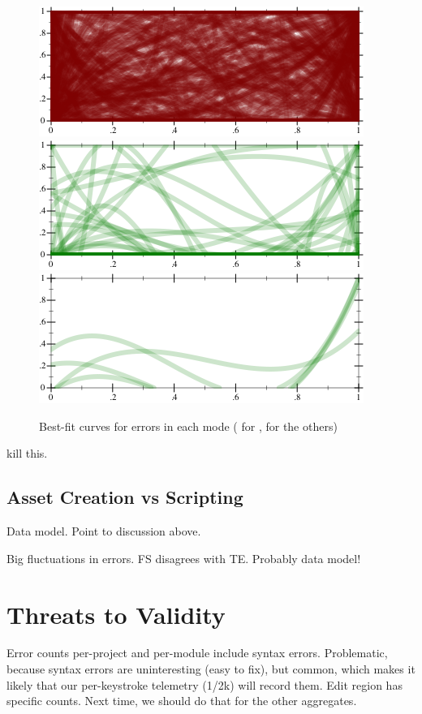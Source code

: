 \documentclass[english,submission,cleveref]{programming}
\begin{document}
\begin{figure}[t]
  \includegraphics[width=0.8\columnwidth]{img/fit-nocheck-Force-3.pdf}
  \includegraphics[width=0.8\columnwidth]{img/fit-nonstrict-TypeE-3.pdf}
  \includegraphics[width=0.8\columnwidth]{img/fit-strict-TypeE-3.pdf}
  \caption{Best-fit curves for errors in each mode ( for \mnocheck{},  for the others)}
  \label{f:scribbles}
\end{figure}

 kill this.

\subsection{Asset Creation vs Scripting}

Data model. Point to discussion above.

Big fluctuations in errors.
FS disagrees with TE.
Probably data model!


\section{Threats to Validity}
\label{s:threats}

Error counts per-project and per-module include syntax errors.
Problematic, because syntax errors are uninteresting (easy to fix),
but common, which makes it likely that our per-keystroke telemetry (1/2k) will record them.
Edit region has specific counts.
Next time, we should do that for the other aggregates.
\end{document}
